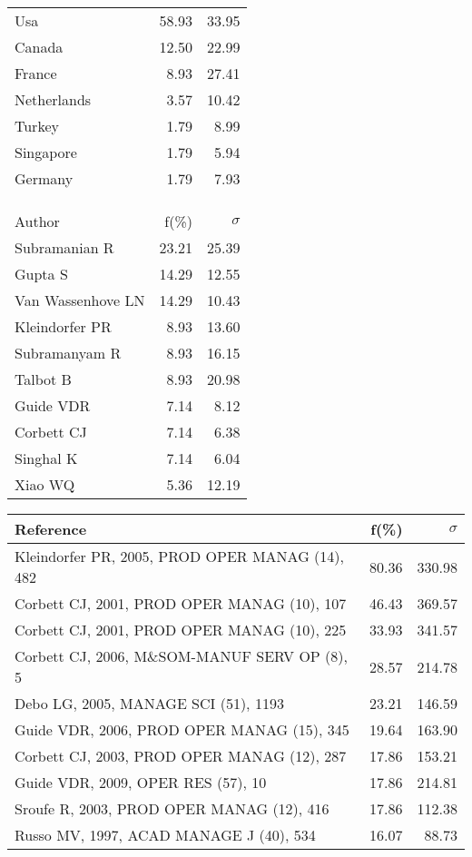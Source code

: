 \documentclass[a4paper,11pt]{report}
\begin{document}
\begin{landscape}
\begin{table}[!ht]
{\begin{tabular}{|l r r|}
\hline
Usa & 58.93 & 33.95\\
Canada & 12.50 & 22.99\\
France & 8.93 & 27.41\\
Netherlands & 3.57 & 10.42\\
Turkey & 1.79 & 8.99\\
Singapore & 1.79 & 5.94\\
Germany & 1.79 & 7.93\\
 &  & \\
 &  & \\
 &  & \\
\hline
\hline
Author & f(\%) & $\sigma$\\
\hline
Subramanian R & 23.21 & 25.39\\
Gupta S & 14.29 & 12.55\\
Van Wassenhove LN & 14.29 & 10.43\\
Kleindorfer PR & 8.93 & 13.60\\
Subramanyam R & 8.93 & 16.15\\
Talbot B & 8.93 & 20.98\\
Guide VDR & 7.14 & 8.12\\
Corbett CJ & 7.14 & 6.38\\
Singhal K & 7.14 & 6.04\\
Xiao WQ & 5.36 & 12.19\\
\hline
\end{tabular}
}
{\scriptsize\begin{tabular}{|l r r|}
\hline
Reference & f(\%) & $\sigma$\\
\hline
Kleindorfer PR, 2005, PROD OPER MANAG (14), 482 & 80.36 & 330.98\\
Corbett CJ, 2001, PROD OPER MANAG (10), 107 & 46.43 & 369.57\\
Corbett CJ, 2001, PROD OPER MANAG (10), 225 & 33.93 & 341.57\\
Corbett CJ, 2006, M\&SOM-MANUF SERV OP (8), 5 & 28.57 & 214.78\\
Debo LG, 2005, MANAGE SCI (51), 1193 & 23.21 & 146.59\\
Guide VDR, 2006, PROD OPER MANAG (15), 345 & 19.64 & 163.90\\
Corbett CJ, 2003, PROD OPER MANAG (12), 287 & 17.86 & 153.21\\
Guide VDR, 2009, OPER RES (57), 10 & 17.86 & 214.81\\
Sroufe R, 2003, PROD OPER MANAG (12), 416 & 17.86 & 112.38\\
Russo MV, 1997, ACAD MANAGE J (40), 534 & 16.07 & 88.73\\

\end{tabular}}
\end{table}
\end{landscape}
\end{document}
